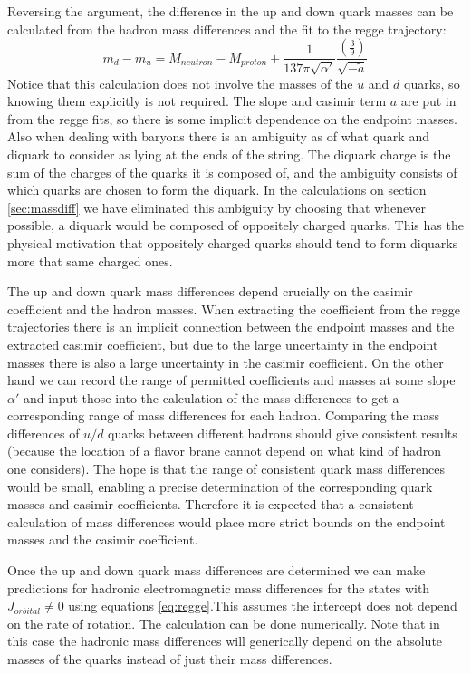 \documentclass[11pt,a4paper]{article}
\begin{document}
Reversing the argument, the difference in the up and down quark masses can be calculated from the hadron mass differences and the fit to the regge trajectory:
\begin{equation*}
m_{d}-m_{u}=M_{neutron}-M_{proton}+\frac{1}{137\pi\sqrt{\alpha'}}\frac{\left(\frac{3}{9}\right)}{\sqrt{-\tilde{a}}}
\end{equation*} 
Notice that this calculation does not involve the masses of the $u$ and $d$ quarks, so knowing them explicitly is not required. The slope and casimir term $a$ are put in from the regge fits, so there is some implicit dependence on the endpoint masses. Also when dealing with baryons there is an ambiguity as of what quark and diquark to consider as lying at the ends of the string. The diquark charge is the sum of the charges of the quarks it is composed of, and the ambiguity consists of which quarks are chosen to form the diquark. In the calculations on section \ref{sec:massdiff} we have eliminated this ambiguity by choosing that whenever possible, a diquark would be composed of oppositely charged quarks. This has the physical motivation that oppositely charged quarks should tend to form diquarks more that same charged ones.

The up and down quark mass differences depend crucially on the casimir coefficient and the hadron masses. When extracting the coefficient from the regge trajectories there is an implicit connection between the endpoint masses and the extracted casimir coefficient, but due to the large uncertainty in the endpoint masses there is also a large uncertainty in the casimir coefficient. On the other hand we can record the range of permitted coefficients and masses at some slope $\alpha'$ and input those into the calculation of the mass differences to get a corresponding range of mass differences for each hadron. Comparing the mass differences of $u/d$ quarks between different hadrons should give consistent results (because the location of a flavor brane cannot depend on what kind of hadron one considers). The hope is that the range of consistent quark mass differences would be small, enabling a precise determination of the corresponding quark masses and casimir coefficients. Therefore it is expected that a consistent calculation of mass differences would place more strict bounds on the endpoint masses and the casimir coefficient.

Once the up and down quark mass differences are determined we can make predictions for hadronic electromagnetic mass differences for the states with $J_{orbital}\neq 0$ using equations \ref{eq:regge}.This assumes the intercept does not depend on the rate of rotation. The calculation can be done numerically. Note that in this case the hadronic mass differences will generically depend on the absolute masses of the quarks instead of just their mass differences.
\end{document}
